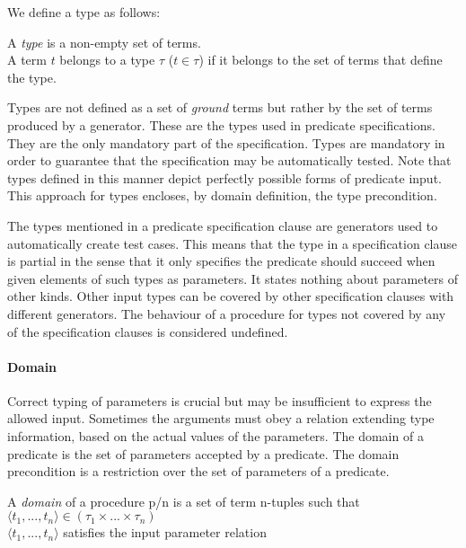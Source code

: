 We define a type as follows: 
%
\begin{definition}
\label{def:type}
A {\em type} is a non-empty set of terms.\\
A term $t$ belongs to a type $\tau$ ($t \in \tau$) if it belongs to the set of
terms that define the type.
\end{definition}


Types are not defined as a set of \emph{ground} terms but rather by
the set of terms produced by a generator.
%
These are the types used in predicate specifications.
%
They are the only mandatory part of the specification.
%
Types are mandatory in order to guarantee that the specification may be
automatically tested.
%
Note that types defined in this manner depict perfectly possible forms of
predicate input.
%
This approach for types %
encloses, by domain definition, the type
precondition.


The types mentioned in a predicate specification clause are \plqc{}
generators used to automatically create %
test cases.
%
This means that the type in a specification clause is partial in the
sense that it only specifies the predicate should succeed when given
elements of such types as parameters.
%
It states nothing about parameters of other kinds.
%
Other input types can be covered by other specification clauses with
different generators.
%
The %
behaviour of a procedure
for types not covered by any of the
specification clauses is considered undefined.


\paragraph{\bf Domain}

Correct typing of parameters is crucial but may be insufficient to
express the allowed input.
%
Sometimes the arguments must obey a relation extending type information,
based on the actual values of the parameters.
%
The domain of a predicate is the set of parameters accepted by a
predicate.
%
The domain precondition is a restriction over the set of parameters of a
predicate.


\begin{definition}
\label{def:domain}
A {\em domain} of a procedure p/n is a set of term
n-tuples such that\\
\qquad $\langle t_1,...,t_n \rangle \in (\tau_1 \times ... \times
\tau_n)$\\
\qquad $\langle t_1,...,t_n \rangle$ satisfies the input parameter relation
\end{definition}


